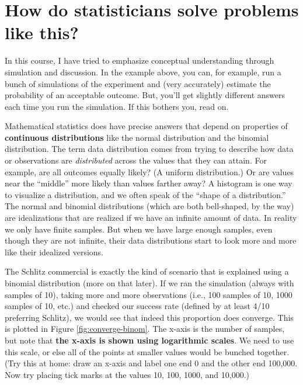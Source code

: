 \documentclass[openany]{book}
\begin{document}
\hypertarget{how-do-statisticians-solve-problems-like-this}{%
\section*{How do statisticians solve problems like this?}\label{how-do-statisticians-solve-problems-like-this}}

In this course, I have tried to emphasize conceptual understanding through simulation and discussion. In the example above, you can, for example, run a bunch of simulations of the experiment and (very accurately) estimate the probability of an acceptable outcome. But, you'll get slightly different answers each time you run the simulation. If this bothers you, read on.

Mathematical statistics does have precise answers that depend on properties of \textbf{continuous distributions} like the normal distribution and the binomial distribution. The term data distribution comes from trying to describe how data or observations are \emph{distributed} across the values that they can attain. For example, are all outcomes equally likely? (A uniform distribution.) Or are values near the ``middle'' more likely than values farther away? A histogram is one way to visualize a distribution, and we often speak of the ``shape of a distribution.'' The normal and binomial distributions (which are both bell-shaped, by the way) are idealizations that are realized if we have an infinite amount of data. In reality we only have finite samples.
But when we have large enough samples, even though they are not infinite, their data distributions start to look more and more like their idealized versions.

The Schlitz commercial is exactly the kind of scenario that is explained using a binomial distribution (more on that later). If we ran the simulation (always with samples of 10), taking more and more observations (i.e., 100 samples of 10, 1000 samples of 10, etc.) and checked our success rate (defined by at least 4/10 preferring Schlitz), we would see that indeed this proportion does converge. This is plotted in Figure \ref{fig:converge-binom}. The x-axis is the number of samples, but note that \textbf{the x-axis is shown using logarithmic scales}. We need to use this scale, or else all of the points at smaller values would be bunched together. (Try this at home: draw an x-axis and label one end 0 and the other end 100,000. Now try placing tick marks at the values 10, 100, 1000, and 10,000.)
\end{document}
